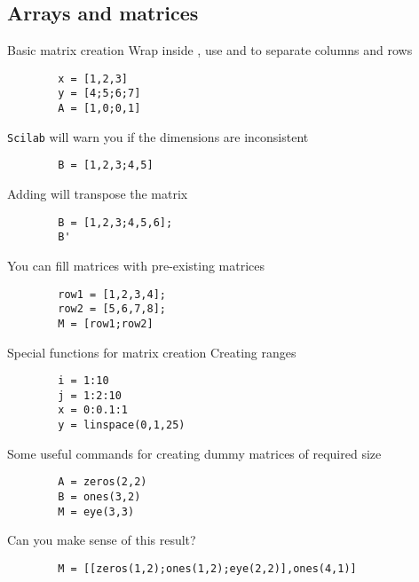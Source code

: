 \documentclass[%
    10pt,
    xcolor={dvipsnames},
    compress, %
]{beamer}
\newcommand{\scilab}{\texttt{Scilab}}
\begin{document}
\subsection{Arrays and matrices}
\begin{frame}[fragile]{Basic matrix creation}
    Wrap inside \inlinecode{[]}, use \inlinecode{,} and \inlinecode{;} to separate columns and rows
    \begin{lstlisting}
        x = [1,2,3]
        y = [4;5;6;7]
        A = [1,0;0,1]
    \end{lstlisting}
    \scilab{} will warn you if the dimensions are inconsistent
    \begin{lstlisting}
        B = [1,2,3;4,5]
    \end{lstlisting}
    Adding  will transpose the matrix
    \begin{lstlisting}
        B = [1,2,3;4,5,6];
        B'
    \end{lstlisting}
    You can fill matrices with pre-existing matrices
    \begin{lstlisting}
        row1 = [1,2,3,4];
        row2 = [5,6,7,8];
        M = [row1;row2]
    \end{lstlisting}
\end{frame}

\begin{frame}[fragile]{Special functions for matrix creation}
    Creating ranges
    \begin{lstlisting}
        i = 1:10
        j = 1:2:10
        x = 0:0.1:1
        y = linspace(0,1,25)
    \end{lstlisting}
    Some useful commands for creating dummy matrices of required size
    \begin{lstlisting}
        A = zeros(2,2)
        B = ones(3,2)
        M = eye(3,3)
    \end{lstlisting}
    Can you make sense of this result?
    \begin{lstlisting}
        M = [[zeros(1,2);ones(1,2);eye(2,2)],ones(4,1)]
    \end{lstlisting}
\end{frame}
\end{document}
